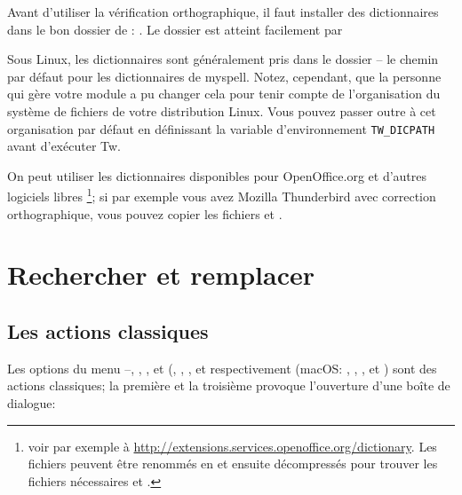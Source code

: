 Avant d'utiliser la vérification orthographique, il faut installer des dictionnaires dans le bon dossier de \Tw: . Le dossier  est atteint facilement par  \submenu{}

\begin{OSLinux}
Sous Linux, les dictionnaires sont généralement pris dans le dossier  -- le chemin par défaut pour les dictionnaires de myspell. Notez, cependant, que la personne qui gère votre module \Tw{} a pu changer cela pour tenir compte de l'organisation du système de fichiers de votre distribution Linux. Vous pouvez passer outre à cet organisation par défaut en définissant la variable d'environnement \verb+TW_DICPATH+ avant d'exécuter Tw.
\end{OSLinux}

On peut utiliser les dictionnaires disponibles pour OpenOffice.org et d'autres logiciels libres \footnote{voir par exemple à \url{http://extensions.services.openoffice.org/dictionary}. Les fichiers  peuvent être renommés en  et ensuite décompressés pour trouver les fichiers nécessaires  et .}; si par exemple vous avez Mozilla Thunderbird avec correction orthographique, vous pouvez copier les fichiers  et . 

\section{Rechercher et remplacer}


\subsection{Les actions classiques}

Les options du menu --, , ,  et  (, , ,  et  respectivement (macOS: , , ,  et ) sont des actions classiques; la première et la troisième provoque l'ouverture d'une boîte de dialogue:

